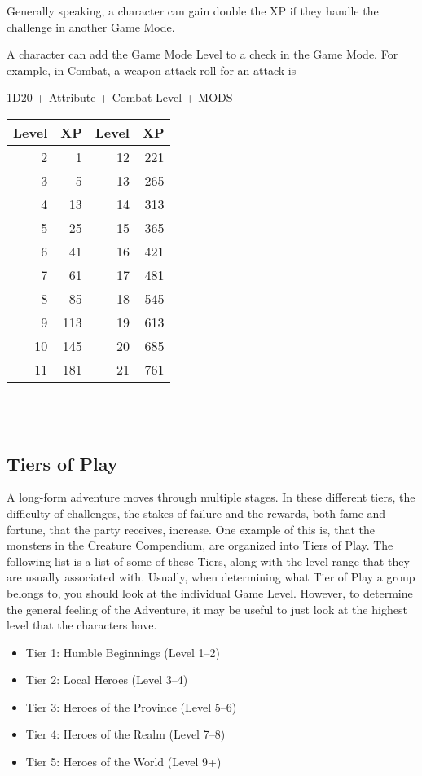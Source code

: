 Generally speaking, a character can gain double the XP if they handle the challenge in another Game Mode.

A character can add the Game Mode Level to a check in the Game Mode. For example, in Combat, a weapon attack roll for an attack is \\
\begin{center}
	
1D20 + Attribute + Combat Level + MODS\\

\begin{tabular}{r r | r r}
Level & XP & Level & XP\\ \hline
2 & 1 & 12 & 221\\
3 & 5 & 13 & 265\\
4 & 13 & 14 & 313\\
5 & 25 & 15 & 365\\
6 & 41 & 16 & 421\\
7 & 61 & 17 & 481\\
8 & 85 & 18 & 545\\
9 & 113 & 19 & 613\\
10 & 145 & 20 & 685\\
11 & 181 & 21 & 761\\
\end{tabular}\\~\\

\end{center}

\subsection{Tiers of Play}\label{subsec:tiersOfPlay}
A long-form adventure moves through multiple stages.
In these different tiers, the difficulty of challenges, the stakes of failure and the rewards, both fame and fortune, that the party receives, increase.
One example of this is, that the monsters in the Creature Compendium, are organized into Tiers of Play.
The following list is a list of some of these Tiers, along with the level range that they are usually associated with.
Usually, when determining what Tier of Play a group belongs to, you should look at the individual Game Level.
However, to determine the general feeling of the Adventure, it may be useful to just look at the highest level that the characters have.

\begin{itemize}
	\item Tier 1: Humble Beginnings (Level 1--2)
	\item Tier 2: Local Heroes (Level 3--4)
	\item Tier 3: Heroes of the Province (Level 5--6)
	\item Tier 4: Heroes of the Realm (Level 7--8)
	\item Tier 5: Heroes of the World (Level 9+)
\end{itemize}


